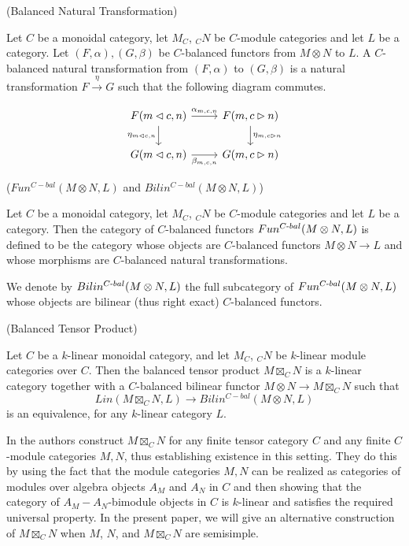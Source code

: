\begin{definition} (Balanced Natural Transformation)

  \noindent Let $C$ be a monoidal category, let $M_{C}$, $_{C}N$ be $C$-module
  categories and let $L$ be a category. Let $(F,\alpha), (G,\beta)$ be
  $C$-balanced functors from $M \otimes N$ to $L$. A $C$-balanced natural
  transformation from $(F,\alpha)$ to $(G,\beta)$ is a natural transformation
  $ F \xrightarrow{\eta} G$ such that the following diagram commutes.

  \[
    \begin{tikzcd}
      F(m \lhd c, n) \arrow[r, "\alpha_{m,c,n}"] \arrow[d, "\eta_{m \lhd c, n}"'] &
      F(m, c \rhd n) \arrow[d, "\eta_{m, c \rhd n}"] \\
      G(m \lhd c, n) \arrow[r, "\beta_{m,c,n}"'] &
      G(m, c \rhd n)
    \end{tikzcd}
  \]
\end{definition}

\begin{definition} ($Fun^{C-bal}(M \otimes N, L)$ and $Bilin^{C-bal}(M \otimes N, L)$)

  \noindent Let $C$ be a monoidal category, let $M_{C}$, $_{C}N$ be $C$-module
  categories and let $L$ be a category. \quad Then the category of
  $C$-balanced functors $Fun^{C{\text -}bal}(M \otimes N, L)$ is defined to be
  the category whose objects are $C$-balanced functors $M \otimes N \to L$ and
  whose morphisms are $C$-balanced natural transformations.

  We denote by $Bilin^{C{\text -}bal}(M \otimes N, L)$ the full subcategory of
  $Fun^{C{\text -}bal}(M \otimes N, L)$ whose objects are bilinear (thus right
  exact) $C$-balanced functors.
\end{definition}

\begin{definition}\label{definition/balanced-tensor-product} (Balanced Tensor Product)

  \noindent Let $C$ be a $k$-linear monoidal category, and let $M_C$, $_{C}N$
  be $k$-linear module categories over $C$. \quad Then the balanced tensor
  product $M \boxtimes_{C} N$ is a $k$-linear category together with a
  $C$-balanced bilinear functor $M\otimes N\to M\boxtimes_{C} N$ such
  that \[Lin(M \boxtimes_{C} N, L) \to Bilin^{C-bal}(M \otimes N, L)\] is an
  equivalence, for any $k$-linear category $L$.
\end{definition}

\noindent In \cite{douglas/balanced-product} the authors construct $M\boxtimes_C N$ for
any finite tensor category $C$ and any finite $C$-module categories $M, N$,
thus establishing existence in this setting. They do this by using the fact
that the module categories $M,N$ can be realized as categories of modules over
algebra objects $A_M$ and $A_N$ in $C$ and then showing that the category of
$A_M-A_N$-bimodule objects in $C$ is $k$-linear and satisfies the required
universal property. In the present paper, we will give an alternative
construction of $M\boxtimes_C N$ when $M$, $N$, and $M \boxtimes_{C} N$ are
semisimple.

